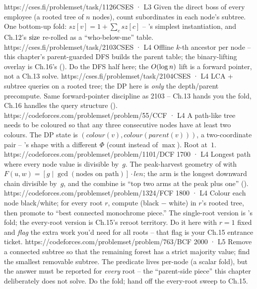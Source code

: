 \begin{mixedset}
    {https://cses.fi/problemset/task/1126}{CSES · L3}
    {Given the direct boss of every employee (a rooted tree of $n$ nodes), count subordinates in each node's subtree. One bottom-up fold: $\mathit{sz}[v] = 1 + \sum_c \mathit{sz}[c]$ -- 's simplest instantiation, and Ch.12's $\operatorname{size}$ re-rolled as a ``who-below-me'' table.}
    {https://cses.fi/problemset/task/2103}{CSES · L4}
    {Offline $k$-th ancestor per node -- this chapter's parent-guarded DFS builds the parent table; the binary-lifting overlay is Ch.16's (). Do the DFS half here; the $O(\log n)$ lift is a forward pointer, not a Ch.13 solve.}
    {https://cses.fi/problemset/task/2104}{CSES · L4}
    {LCA + subtree queries on a rooted tree; the DP here is \emph{only} the depth/parent precompute. Same forward-pointer discipline as 2103 -- Ch.13 hands you the fold, Ch.16 handles the query structure ().}
    {https://codeforces.com/problemset/problem/55/C}{CF · L4}
    {A path-like tree needs to be coloured so that any three consecutive nodes have at least two colours. The DP state is $(\mathit{colour}(v),\mathit{colour}(\mathit{parent}(v)))$, a two-coordinate pair -- 's shape with a different $\Phi$ (count instead of $\max$). Root at~$1$.}
    {https://codeforces.com/problemset/problem/1101/D}{CF 1700 · L4}
    {Longest path where every node value is divisible by~$g$. The peak-harvest geometry of  with $F(u,w)=[g\mid \gcd(\text{nodes on path})] \cdot \mathit{len}$; the arm is the longest downward chain divisible by~$g$, and the combine is ``top two arms at the peak plus one'' ().}
    {https://codeforces.com/problemset/problem/1324/F}{CF 1800 · L4}
    {Colour each node black/white; for every root $r$, compute (black $-$ white) in $r$'s rooted tree, then promote to ``best connected monochrome piece.'' The single-root version is 's fold; the every-root version is Ch.15's  reroot territory. Do it here with $r=1$ fixed and \emph{flag} the extra work you'd need for all roots -- that flag is your Ch.15 entrance ticket.}
    {https://codeforces.com/problemset/problem/763/B}{CF 2000 · L5}
    {Remove a connected subtree so that the remaining forest has a strict majority value; find the smallest removable subtree. The predicate lives per-node (a scalar fold), but the answer must be reported for \emph{every} root -- the ``parent-side piece'' this chapter deliberately does not solve. Do the fold; hand off the every-root sweep to Ch.15.}

\end{mixedset}
